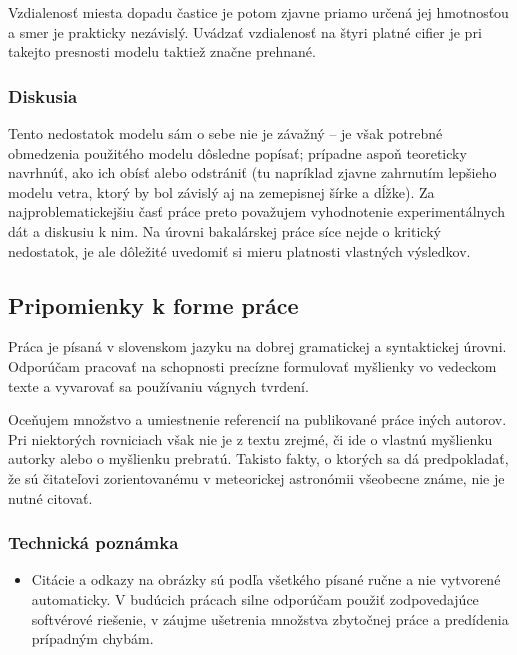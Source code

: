 Vzdialenosť miesta dopadu častice je potom zjavne priamo určená jej
hmotnosťou a smer je prakticky nezávislý. Uvádzať vzdialenosť na štyri
platné cifier je pri takejto presnosti modelu taktiež značne prehnané.

\hypertarget{diskusia}{%
\subsubsection{Diskusia}\label{diskusia}}

Tento nedostatok modelu sám o sebe nie je závažný -- je však potrebné
obmedzenia použitého modelu dôsledne popísať; prípadne aspoň teoreticky
navrhnúť, ako ich obísť alebo odstrániť (tu napríklad zjavne zahrnutím
lepšieho modelu vetra, ktorý by bol závislý aj na zemepisnej šírke a
dĺžke). Za najproblematickejšiu časť práce preto považujem vyhodnotenie
experimentálnych dát a diskusiu k nim. Na úrovni bakalárskej práce síce
nejde o kritický nedostatok, je ale dôležité uvedomiť si mieru platnosti
vlastných výsledkov.

\hypertarget{pripomienky-k-forme-pruxe1ce}{%
\subsection{Pripomienky k forme
práce}\label{pripomienky-k-forme-pruxe1ce}}

Práca je písaná v slovenskom jazyku na dobrej gramatickej a syntaktickej
úrovni. Odporúčam pracovať na schopnosti precízne formulovať myšlienky
vo vedeckom texte a vyvarovať sa používaniu vágnych tvrdení.

Oceňujem množstvo a umiestnenie referencií na publikované práce iných
autorov. Pri niektorých rovniciach však nie je z textu zrejmé, či ide o
vlastnú myšlienku autorky alebo o myšlienku prebratú. Takisto fakty, o
ktorých sa dá predpokladať, že sú čitateľovi zorientovanému v
meteorickej astronómii všeobecne známe, nie je nutné citovať.

\hypertarget{sec:technical}{%
\subsubsection{Technická poznámka}\label{sec:technical}}

\begin{itemize}
\tightlist
\item
  Citácie a odkazy na obrázky sú podľa všetkého písané ručne a nie
  vytvorené automaticky. V budúcich prácach silne odporúčam použiť
  zodpovedajúce softvérové riešenie, v záujme ušetrenia množstva
  zbytočnej práce a predídenia prípadným chybám.
\end{itemize}

